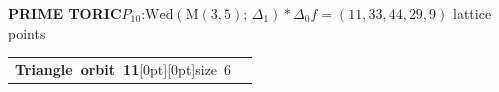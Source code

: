 \documentclass[14pt]{extarticle}
\makeatletter
\newcommand{\AtlasSupportOrbitSplit}[2]{%
  \begin{tabularx}{\linewidth}[t]{%
    @{}>{\raggedright\arraybackslash}p{.37\linewidth}%
    @{\hspace{2.5mm}\AtlasOrbitDivider\hspace{2.5mm}}%
    >{\raggedright\arraybackslash}X@{}}%
    \begin{minipage}[t]{\linewidth}\vspace{0pt}#1\end{minipage} &
    \begin{minipage}[t]{\linewidth}\vspace{0pt}#2\end{minipage}
  \end{tabularx}}
\makeatother
\begin{document}
\begin{atlasbox}\begin{atlaspanel}
\textcolor{toricgreen}{\bfseries PRIME TORIC}\quad \(P_{10}\):\enspace \(\mathrm{Wed}(\mathrm{M}(3,5);\,\Delta_1)\ast\Delta_{0}\)\quad \(f=(11,33,44,29,9)\) lattice points
\end{atlaspanel}\end{atlasbox}
\clearpage
\begin{atlaspanel}[top=1mm,bottom=2mm]
\AtlasSupportOrbitSplit{%
\vspace*{-3mm}\mbox{{\LARGE\bfseries Triangle orbit 11}\hspace{3mm}\raisebox{.8mm}[0pt][0pt]{{\fontsize{16}{18}\selectfont\color{muted}size 6}}}%
}{%
\vspace*{-3mm}{\fontsize{13}{16}\selectfont{\color{muted}\(\mathbb{Q}\) and \(\mathbb{F}_2\)}\quad{\color{muted}\(\underline{\{3,\,9,\,21\}}\), \(\{5,\,10,\,22\}\), \(\{14,\,16,\,30\}\), \(\{14,\,27,\,30\}\), \(\{10,\,22,\,46\}\), \(\{9,\,21,\,47\}\)}\rule[-3mm]{0pt}{3mm}}%
}%
\end{atlaspanel}\vspace{2mm}
\end{document}

